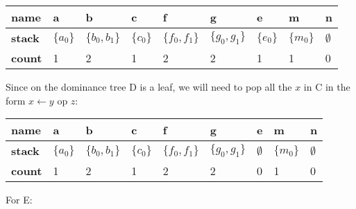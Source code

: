 \noindent
\begin{tabularx}{1.0\textwidth}{
    |X|X|X|X|X|X|X|X|X|
}
\hline
\textbf{name} & a & b & c & f & g & e & m & n \\
\hline
\textbf{stack} & $\{a_0\}$ & $\{b_0, b_1\}$ & $\{c_0\}$ & $\{f_0, f_1\}$ & $\{g_0, g_1\}$ & $\{e_0\}$ & $\{m_0\}$ & $\emptyset$ \\
\hline
\textbf{count} & 1 & 2 & 1 & 2 & 2 & 1 & 1 & 0 \\
\hline
\end{tabularx}

\vskip 0.2in

\noindent Since on the dominance tree D is a leaf, we will need to pop all the $x$ in C in the form $x \leftarrow y \text{ op } z$:

\noindent
\begin{tabularx}{1.0\textwidth}{
    |X|X|X|X|X|X|X|X|X|
}
\hline
\textbf{name} & a & b & c & f & g & e & m & n \\
\hline
\textbf{stack} & $\{a_0\}$ & $\{b_0, b_1\}$ & $\{c_0\}$ & $\{f_0, f_1\}$ & $\{g_0, g_1\}$ & $\emptyset$ & $\{m_0\}$ & $\emptyset$ \\
\hline
\textbf{count} & 1 & 2 & 1 & 2 & 2 & 0 & 1 & 0 \\
\hline
\end{tabularx}

\vskip 0.2in

\noindent For E:

